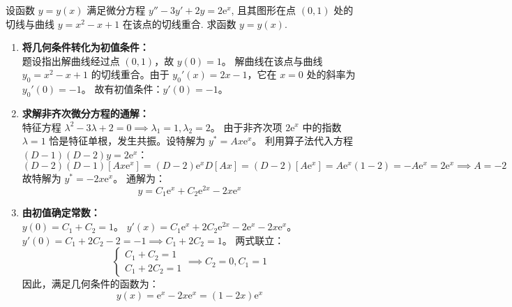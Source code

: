 \documentclass[lang=cn,11pt]{elegantbook}
\begin{document}
\begin{exercise}[利用切线条件的非齐次方程初值问题]
设函数 $y=y(x)$ 满足微分方程 $y''-3y'+2y=2\mathrm{e}^x$, 且其图形在点 $(0,1)$ 处的切线与曲线 $y=x^2-x+1$ 在该点的切线重合. 求函数 $y=y(x)$.
\end{exercise}
\begin{solution}
\begin{enumerate}
    \item \textbf{将几何条件转化为初值条件：}\\
    题设指出解曲线经过点 $(0,1)$，故 $y(0) = 1$。
    解曲线在该点与曲线 $y_0 = x^2-x+1$ 的切线重合。由于 $y_0'(x) = 2x - 1$，它在 $x=0$ 处的斜率为 $y_0'(0) = -1$。
    故有初值条件：$y'(0) = -1$。

    \item \textbf{求解非齐次微分方程的通解：}\\
    特征方程 $\lambda^2 - 3\lambda + 2 = 0 \implies \lambda_1=1, \lambda_2=2$。
    由于非齐次项 $2\mathrm{e}^x$ 中的指数 $\lambda=1$ 恰是特征单根，发生共振。设特解为 $y^* = Ax\mathrm{e}^x$。
    利用算子法代入方程 $(D-1)(D-2)y = 2\mathrm{e}^x$：
    \[
    (D-2)(D-1)[Ax\mathrm{e}^x] = (D-2)\mathrm{e}^x D[Ax] = (D-2)[A\mathrm{e}^x] = A\mathrm{e}^x(1-2) = -A\mathrm{e}^x = 2\mathrm{e}^x \implies A=-2
    \]
    故特解为 $y^* = -2x\mathrm{e}^x$。
    通解为：
    \[
    y = C_1\mathrm{e}^x + C_2\mathrm{e}^{2x} - 2x\mathrm{e}^x
    \]

    \item \textbf{由初值确定常数：}\\
    $y(0) = C_1 + C_2 = 1$。
    $y'(x) = C_1\mathrm{e}^x + 2C_2\mathrm{e}^{2x} - 2\mathrm{e}^x - 2x\mathrm{e}^x$。
    $y'(0) = C_1 + 2C_2 - 2 = -1 \implies C_1 + 2C_2 = 1$。
    两式联立：
    \[
    \begin{cases}
    C_1 + C_2 = 1 \\
    C_1 + 2C_2 = 1
    \end{cases}
    \implies C_2 = 0, C_1 = 1
    \]
    因此，满足几何条件的函数为：
    \[
    \boxed{y(x) = \mathrm{e}^x - 2x\mathrm{e}^x = (1-2x)\mathrm{e}^x}
    \]
\end{enumerate}
\end{solution}
\end{document}

